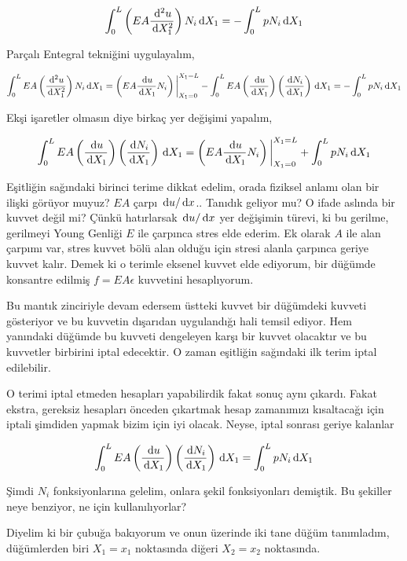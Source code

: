 \documentclass[12pt,fleqn]{article}\usepackage{../../common}
\begin{document}
$$
\int_{0}^{L} \left( EA \frac{\,\mathrm{d}^2 u}{\,\mathrm{d} X_1^2} \right) N_i \,\mathrm{d} X_1 =
- \int_{0}^{L} p N_i \,\mathrm{d} X_1
$$

Parçalı Entegral tekniğini uygulayalım,

$$
\int_{0}^{L} EA \left( \frac{\,\mathrm{d}^2 u}{\,\mathrm{d} X_1^2}  \right) N_i \,\mathrm{d} X_1 =
\left( EA \frac{\,\mathrm{d} u}{\,\mathrm{d} X_1} N_i \right) \bigg\vert_{X_1=0}^{X_1=L} -
\int_{0}^{L} EA
\left( \frac{\,\mathrm{d} u}{\,\mathrm{d} X_1} \right)
\left( \frac{\,\mathrm{d} N_i}{\,\mathrm{d} X_1} \right) \,\mathrm{d} X_1 =
- \int_{0}^{L} p N_i \,\mathrm{d} X_1
$$

Ekşi işaretler olmasın diye birkaç yer değişimi yapalım,

$$
\int_{0}^{L} EA
\left( \frac{\,\mathrm{d} u}{\,\mathrm{d} X_1} \right)
\left( \frac{\,\mathrm{d} N_i}{\,\mathrm{d} X_1} \right) \,\mathrm{d} X_1
=
\left( EA \frac{\,\mathrm{d} u}{\,\mathrm{d} X_1} N_i \right) \bigg\vert_{X_1=0}^{X_1=L} +
\int_{0}^{L} p N_i \,\mathrm{d} X_1 
$$

Eşitliğin sağındaki birinci terime dikkat edelim, orada fiziksel anlamı olan bir
ilişki görüyor muyuz? $EA$ çarpı $\,\mathrm{d} u / \,\mathrm{d} x$.. Tanıdık geliyor mu?  O ifade
aslında bir kuvvet değil mi? Çünkü hatırlarsak $\,\mathrm{d} u / \,\mathrm{d} x$ yer değişimin
türevi, ki bu gerilme, gerilmeyi Young Genliği $E$ ile çarpınca stres elde
ederim. Ek olarak $A$ ile alan çarpımı var, stres kuvvet bölü alan olduğu için
stresi alanla çarpınca geriye kuvvet kalır. Demek ki o terimle eksenel kuvvet
elde ediyorum, bir düğümde konsantre edilmiş $f = E A \epsilon$ kuvvetini
hesaplıyorum. 

Bu mantık zinciriyle devam edersem üstteki kuvvet bir düğümdeki kuvveti
gösteriyor ve bu kuvvetin dışarıdan uygulandığı hali temsil ediyor. Hem
yanındaki düğümde bu kuvveti dengeleyen karşı bir kuvvet olacaktır ve
bu kuvvetler birbirini iptal edecektir. O zaman eşitliğin sağındaki
ilk terim iptal edilebilir.

O terimi iptal etmeden hesapları yapabilirdik fakat sonuç aynı çıkardı. Fakat
ekstra, gereksiz hesapları önceden çıkartmak hesap zamanımızı kısaltacağı için
iptali şimdiden yapmak bizim için iyi olacak. Neyse, iptal sonrası geriye
kalanlar

$$
\int_{0}^{L} EA
\left( \frac{\,\mathrm{d} u}{\,\mathrm{d} X_1} \right)
\left( \frac{\,\mathrm{d} N_i}{\,\mathrm{d} X_1} \right) \,\mathrm{d} X_1
= \int_{0}^{L} p N_i \,\mathrm{d} X_1 
$$

Şimdi $N_i$ fonksiyonlarına gelelim, onlara şekil fonksiyonları demiştik.
Bu şekiller neye benziyor, ne için kullanılıyorlar?

Diyelim ki bir çubuğa bakıyorum ve onun üzerinde iki tane düğüm tanımladım,
düğümlerden biri $X_1 = x_1$ noktasında diğeri $X_2 = x_2$ noktasında.
\end{document}
